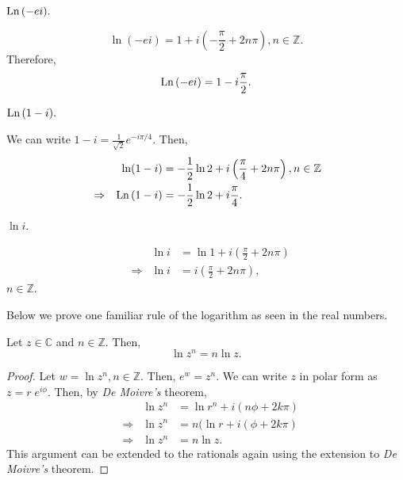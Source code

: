 \documentclass[12pt]{book}
\begin{document}
\begin{exmp}
    $\text{Ln}\, (-ei).$
\end{exmp}
\[
    \ln (-ei) = 1 + i\left(-\frac{\pi}{2} + 2n\pi\right), n \in \mathbb{Z}.
\]
Therefore, 
\[
    \text{Ln}\, (-ei) = 1 - i\frac{\pi}{2}.
\]

\begin{exmp}
    $\text{Ln}\, (1 - i).$
\end{exmp}
We can write $1 - i = \frac{1}{\sqrt{2}} e^{-i\pi / 4}.$ Then,
\begin{align*}
    &&\ln (1 -  i) 
        &= 
            -\frac{1}{2}\ln 2  + i\left(\frac{\pi}{4} + 2n\pi\right), n \in \mathbb{Z} \\
    &\Rightarrow &\text{Ln}\, (1 - i)
        &=
            -\frac{1}{2}\ln 2  + i\frac{\pi}{4}. \\
\end{align*}

\begin{exmp}
    $\ln i.$
\end{exmp}

\begin{align*}
    &&\ln i 
        &= 
            \ln 1 + i\left(\frac{\pi}{2} + 2n\pi\right) \\
    &\Rightarrow &\ln i
        &=
        i\left(\frac{\pi}{2} + 2n\pi\right),
\end{align*}
$n \in \mathbb{Z}.$

Below we prove one familiar rule of the logarithm as seen in the real numbers. 
\begin{thm}
    Let $z \in \mathbb{C}$ and $n \in \mathbb{Z}.$ Then, 
    \[
        \ln z^n = n\ln z.
    \]
\end{thm}
\begin{proof}
    Let $w = \ln z^n, n \in \mathbb{Z}.$ Then, $e^{w} = z^{n}.$ We can write $z$ in polar form as $z = r\;e^{i\phi}.$ Then, by \textit{De Moivre's} theorem,
    \begin{align*}
        &&\ln z^n 
            &= 
                \ln r^{n} + i \left(n\phi + 2k\pi\right)\\ 
        &\Rightarrow &\ln z^{n}
            &=
                n (\ln r +  i\left(\phi + 2k\pi\right)\\
        &\Rightarrow &\ln z^{n}
            &=
                n \ln z.
    \end{align*}
This argument can be extended to the rationals again using the extension to \textit{De Moivre's} theorem.
\end{proof}
\end{document}
